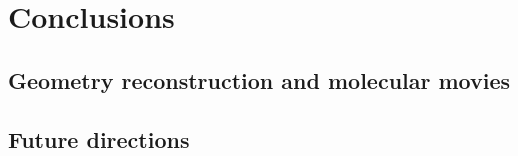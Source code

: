 \chapter{Conclusions}\label{ch:conclusion}

\section{Geometry reconstruction and molecular movies}
\section{Future directions}